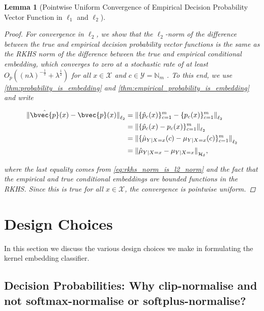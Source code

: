 \documentclass{article}
\newtheorem{lemma}{Lemma}[theorem]
\begin{document}
\begin{lemma}[Pointwise Uniform Convergence of Empirical Decision Probability Vector Function in $\ell_{1}$ and $\ell_{2}$]
\begin{proof}
			For convergence in $\ell_{2}$, we show that the $\ell_{2}$-norm of the difference between the true and empirical decision probability vector functions is the same as the RKHS norm of the difference between the true and empirical conditional embedding, which converges to zero at a stochastic rate of at least $O_{p}((n \lambda)^{-\frac{1}{2}} + \lambda^{\frac{1}{2}})$ for all $x \in \mathcal{X}$ and $c \in \mathcal{Y} = \mathbb{N}_{m}$ \citep{song2009hilbert}. To this end, we use \cref{thm:probability_is_embedding} and \cref{thm:empirical_probability_is_embedding} and write 
			
			\begin{equation}
			\begin{aligned}
				{\lVert \hat{\bvec{p}}(x)  - \bvec{p}(x) \rVert}_{\ell_{2}} &= {\lVert \{ \hat{p}_{c}(x) \}_{c = 1}^{m} - \{ p_{c}(x) \}_{c = 1}^{m} \rVert}_{\ell_{2}} \\
				&= {\lVert \{ \hat{p}_{c}(x) - p_{c}(x) \}_{c = 1}^{m} \rVert}_{\ell_{2}} \\
				&= {\lVert \{ \hat{\mu}_{Y | X = x}(c) - \mu_{Y | X = x}(c)\}_{c = 1}^{m} \rVert}_{\ell_{2}} \\
				&= {\lVert \hat{\mu}_{Y | X = x} - \mu_{Y | X = x}\rVert}_{\mathcal{H}_{\delta}},
			\end{aligned}
			\end{equation}
			
			where the last equality comes from \eqref{eq:rkhs_norm_is_l2_norm} and the fact that the empirical and true conditional embeddings are bounded functions in the RKHS. Since this is true for all $x \in \mathcal{X}$, the convergence is pointwise uniform.
		\end{proof}
		
	\end{lemma}
	
	
	
\section{Design Choices}
\label{app:design_choices}

	In this section we discuss the various design choices we make in formulating the kernel embedding classifier.

	\subsection{Decision Probabilities: Why clip-normalise and not softmax-normalise or softplus-normalise?}
	
\end{document}
